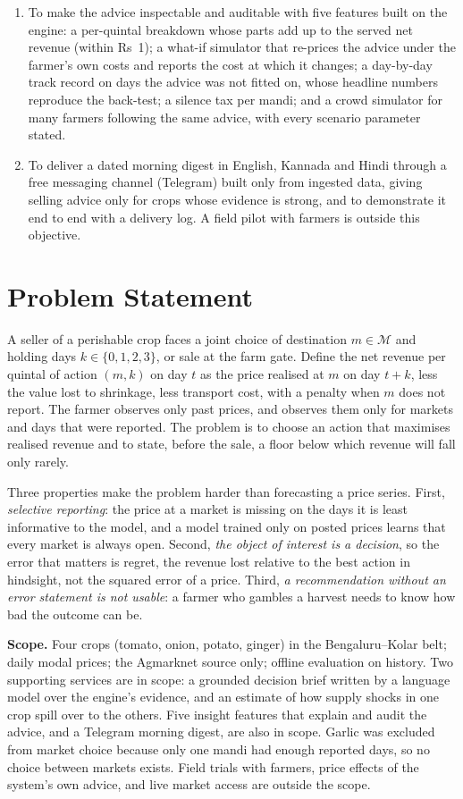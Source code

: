 \begin{enumerate}
    \item To make the advice inspectable and auditable with five features built on the engine: a per-quintal breakdown whose parts add up to the served net revenue (within Rs~1); a what-if simulator that re-prices the advice under the farmer's own costs and reports the cost at which it changes; a day-by-day track record on days the advice was not fitted on, whose headline numbers reproduce the back-test; a silence tax per mandi; and a crowd simulator for many farmers following the same advice, with every scenario parameter stated.
    \item To deliver a dated morning digest in English, Kannada and Hindi through a free messaging channel (Telegram) built only from ingested data, giving selling advice only for crops whose evidence is strong, and to demonstrate it end to end with a delivery log. A field pilot with farmers is outside this objective.
\end{enumerate}

\section{Problem Statement}
\label{sec:problem-statement}

A seller of a perishable crop faces a joint choice of destination $m\in\mathcal{M}$ and holding days $k\in\{0,1,2,3\}$, or sale at the farm gate. Define the net revenue per quintal of action $(m,k)$ on day $t$ as the price realised at $m$ on day $t+k$, less the value lost to shrinkage, less transport cost, with a penalty when $m$ does not report. The farmer observes only past prices, and observes them only for markets and days that were reported. The problem is to choose an action that maximises realised revenue and to state, before the sale, a floor below which revenue will fall only rarely.

Three properties make the problem harder than forecasting a price series. First, \emph{selective reporting}: the price at a market is missing on the days it is least informative to the model, and a model trained only on posted prices learns that every market is always open. Second, \emph{the object of interest is a decision}, so the error that matters is regret, the revenue lost relative to the best action in hindsight, not the squared error of a price. Third, \emph{a recommendation without an error statement is not usable}: a farmer who gambles a harvest needs to know how bad the outcome can be.

\noindent \textbf{Scope.} Four crops (tomato, onion, potato, ginger) in the Bengaluru--Kolar belt; daily modal prices; the Agmarknet source only; offline evaluation on history. Two supporting services are in scope: a grounded decision brief written by a language model over the engine's evidence, and an estimate of how supply shocks in one crop spill over to the others. Five insight features that explain and audit the advice, and a Telegram morning digest, are also in scope. Garlic was excluded from market choice because only one mandi had enough reported days, so no choice between markets exists. Field trials with farmers, price effects of the system's own advice, and live market access are outside the scope.

